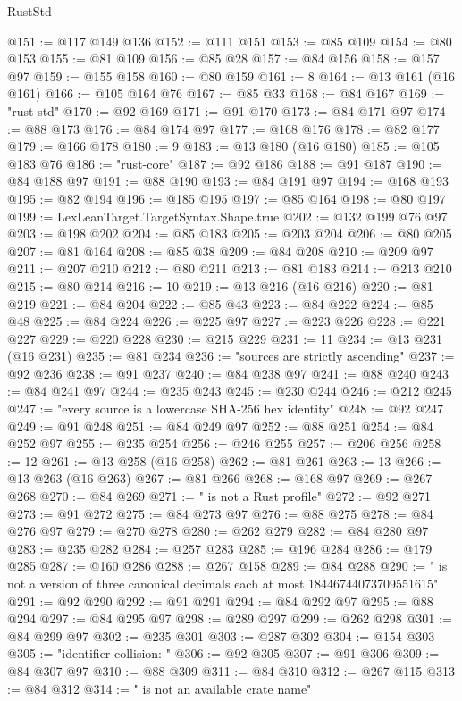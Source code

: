 \begin{lexlean}{RustStd}
\begin{coremodule}
@151 := @117 @149 @136
@152 := @111 @151
@153 := @85 @109
@154 := @80 @153
@155 := @81 @109
@156 := @85 @28
@157 := @84 @156
@158 := @157 @97
@159 := @155 @158
@160 := @80 @159
@161 := 8
@164 := @13 @161 (@16 @161)
@166 := @105 @164 @76
@167 := @85 @33
@168 := @84 @167
@169 := "rust-std"
@170 := @92 @169
@171 := @91 @170
@173 := @84 @171 @97
@174 := @88 @173
@176 := @84 @174 @97
@177 := @168 @176
@178 := @82 @177
@179 := @166 @178
@180 := 9
@183 := @13 @180 (@16 @180)
@185 := @105 @183 @76
@186 := "rust-core"
@187 := @92 @186
@188 := @91 @187
@190 := @84 @188 @97
@191 := @88 @190
@193 := @84 @191 @97
@194 := @168 @193
@195 := @82 @194
@196 := @185 @195
@197 := @85 @164
@198 := @80 @197
@199 := LexLeanTarget.TargetSyntax.Shape.true
@202 := @132 @199 @76 @97
@203 := @198 @202
@204 := @85 @183
@205 := @203 @204
@206 := @80 @205
@207 := @81 @164
@208 := @85 @38
@209 := @84 @208
@210 := @209 @97
@211 := @207 @210
@212 := @80 @211
@213 := @81 @183
@214 := @213 @210
@215 := @80 @214
@216 := 10
@219 := @13 @216 (@16 @216)
@220 := @81 @219
@221 := @84 @204
@222 := @85 @43
@223 := @84 @222
@224 := @85 @48
@225 := @84 @224
@226 := @225 @97
@227 := @223 @226
@228 := @221 @227
@229 := @220 @228
@230 := @215 @229
@231 := 11
@234 := @13 @231 (@16 @231)
@235 := @81 @234
@236 := "sources are strictly ascending"
@237 := @92 @236
@238 := @91 @237
@240 := @84 @238 @97
@241 := @88 @240
@243 := @84 @241 @97
@244 := @235 @243
@245 := @230 @244
@246 := @212 @245
@247 := "every source is a lowercase SHA-256 hex identity"
@248 := @92 @247
@249 := @91 @248
@251 := @84 @249 @97
@252 := @88 @251
@254 := @84 @252 @97
@255 := @235 @254
@256 := @246 @255
@257 := @206 @256
@258 := 12
@261 := @13 @258 (@16 @258)
@262 := @81 @261
@263 := 13
@266 := @13 @263 (@16 @263)
@267 := @81 @266
@268 := @168 @97
@269 := @267 @268
@270 := @84 @269
@271 := " is not a Rust profile"
@272 := @92 @271
@273 := @91 @272
@275 := @84 @273 @97
@276 := @88 @275
@278 := @84 @276 @97
@279 := @270 @278
@280 := @262 @279
@282 := @84 @280 @97
@283 := @235 @282
@284 := @257 @283
@285 := @196 @284
@286 := @179 @285
@287 := @160 @286
@288 := @267 @158
@289 := @84 @288
@290 := " is not a version of three canonical decimals each at most 18446744073709551615"
@291 := @92 @290
@292 := @91 @291
@294 := @84 @292 @97
@295 := @88 @294
@297 := @84 @295 @97
@298 := @289 @297
@299 := @262 @298
@301 := @84 @299 @97
@302 := @235 @301
@303 := @287 @302
@304 := @154 @303
@305 := "identifier collision: "
@306 := @92 @305
@307 := @91 @306
@309 := @84 @307 @97
@310 := @88 @309
@311 := @84 @310
@312 := @267 @115
@313 := @84 @312
@314 := " is not an available crate name"

\end{coremodule}
\end{lexlean}
